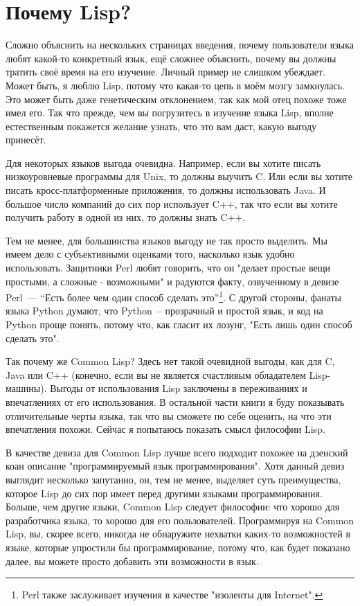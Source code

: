 \section{Почему Lisp?}

Сложно объяснить на нескольких страницах введения, почему пользователи языка любят
какой-то конкретный язык, ещё сложнее объяснить, почему вы должны тратить своё время на
его изучение. Личный пример не слишком убеждает. Может быть, я люблю Lisp, потому что
какая-то цепь в моём мозгу замкнулась. Это может быть даже генетическим отклонением, так
как мой отец похоже тоже имел его. Так что прежде, чем вы погрузитесь в изучение языка
Lisp, вполне естественным покажется желание узнать, что это вам даст, какую выгоду
принесёт.

Для некоторых языков выгода очевидна. Например, если вы хотите писать низкоуровневые
программы для Unix, то должны выучить C. Или если вы хотите писать кросс-платформенные
приложения, то должны использовать Java. И большое число компаний до сих пор использует
C++, так что если вы хотите получить работу в одной из них, то должны знать C++.

Тем не менее, для большинства языков выгоду не так просто выделить. Мы имеем дело с
субъективными оценками того, насколько язык удобно использовать. Защитники Perl любят
говорить, что он "делает простые вещи простыми, а сложные - возможными" и радуются факту,
озвученному в девизе Perl~--- ``Есть более чем один способ сделать это''\footnote{Perl
  также заслуживает изучения в качестве "изоленты для Internet".}. С другой стороны,
фанаты языка Python думают, что Python~-- прозрачный и простой язык, и код на Python проще
понять, потому что, как гласит их лозунг, "Есть лишь один способ сделать это".

Так почему же Common Lisp? Здесь нет такой очевидной выгоды, как для C, Java или C++
(конечно, если вы не является счастливым обладателем Lisp-машины). Выгоды от использования
Lisp заключены в переживаниях и впечатлениях от его использования. В остальной части книги
я буду показывать отличительные черты языка, так что вы сможете по себе оценить, на что
эти впечатления похожи. Сейчас я попытаюсь показать смысл философии Lisp.

В качестве девиза для Common Lisp лучше всего подходит похожее на дзенский коан описание
"программируемый язык программирования". Хотя данный девиз выглядит несколько запутанно,
он, тем не менее, выделяет суть преимущества, которое Lisp до сих пор имеет перед другими
языками программирования. Больше, чем другие языки, Common Lisp следует философии: что
хорошо для разработчика языка, то хорошо для его пользователей. Программируя на Common
Lisp, вы, скорее всего, никогда не обнаружите нехватки каких-то возможностей в языке,
которые упростили бы программирование, потому что, как будет показано далее, вы можете
просто добавить эти возможности в язык.

